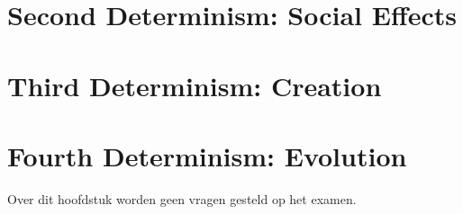 \documentclass[../summary.tex]{subfiles}
\begin{document}
	\section{Second Determinism: Social Effects}
	
	\section{Third Determinism: Creation}
	
	\section{Fourth Determinism: Evolution}
	Over dit hoofdstuk worden geen vragen gesteld op het examen.
		
\end{document}
